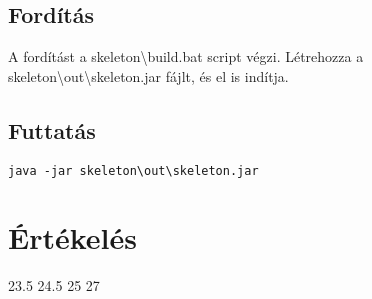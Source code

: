 \subsection{Fordítás}
A fordítást a skeleton\textbackslash{}build.bat script végzi. Létrehozza a skeleton\textbackslash{}out\textbackslash{}skeleton.jar fájlt, és el is indítja.

\subsection{Futtatás}

\lstset{escapeinside=`', xleftmargin=10pt, frame=single, basicstyle=\ttfamily\footnotesize, language=sh}
\begin{lstlisting}
java -jar skeleton\out\skeleton.jar
\end{lstlisting}

\section{Értékelés}


\begin{ertekeles}
{23.5}        %
{24.5}
{25}
{27}
\end{ertekeles}

